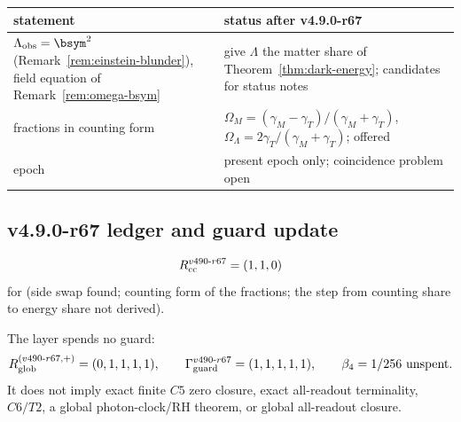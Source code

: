 \begin{center}
\small
\begin{tabular}{@{}>{\raggedright\arraybackslash}p{}>{\raggedright\arraybackslash}p{}@{}}
\toprule
statement & status after v4.9.0-r67\\
\midrule
\(\Lambda_{\mathrm{obs}}=\bsym^2\) (Remark~\ref{rem:einstein-blunder}), field equation of Remark~\ref{rem:omega-bsym} & give \(\Lambda\) the matter share of Theorem~\ref{thm:dark-energy}; candidates for status notes\\
fractions in counting form & \(\Omega_M=(\gamma_M-\gamma_T)/(\gamma_M+\gamma_T)\), \(\Omega_\Lambda=2\gamma_T/(\gamma_M+\gamma_T)\); offered\\
epoch & present epoch only; coincidence problem open\\
\bottomrule
\end{tabular}
\end{center}

\subsection*{v4.9.0-r67 ledger and guard update}
\label{subsec:v490-r67-ledger-guard}

\[
R_{\rm cc}^{v490\text{-}r67}=(1,1,0)
\]
for (side swap found; counting form of the fractions; the step from counting share to energy share not derived).

The layer spends no guard:
\[
R_{\rm glob}^{(v490\text{-}r67,+)}=(0,1,1,1,1),
\qquad
\Gamma_{\rm guard}^{v490\text{-}r67}=(1,1,1,1,1),
\qquad
\beta_4=1/256\ \text{unspent}.
\]
It does not imply exact finite \(C5\) zero closure, exact all-readout terminality,
\(C6/T2\), a global photon-clock/RH theorem, or global all-readout closure.
